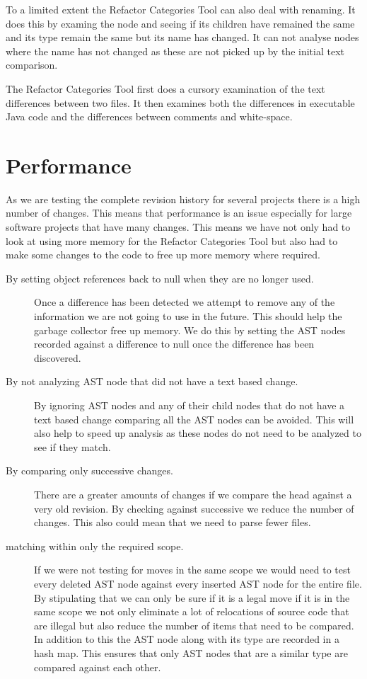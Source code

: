 To a limited extent the Refactor Categories Tool can also deal with renaming. It does this by examing the node and seeing if its children have remained the same and its type remain the same but its name has changed. It can not analyse nodes where the name has not changed as these are not picked up by the initial text comparison.

The Refactor Categories Tool first does a cursory examination of the text differences between two files. It then examines both the differences in executable Java code and the differences between comments and white-space. 



\section{Performance}
As we are testing the complete revision history for several projects there is a high number of changes.  This means that performance is an issue especially for large software projects that have many changes. This means we have not only had to look at using more memory for the Refactor Categories Tool but also had to make some changes to the code to free up more memory where required.

\begin{description}
 \item [By setting object references back to null when they are no longer used.]
  Once a difference has been detected we attempt to remove any of the information we are not going to use in the future.  This should help the garbage collector free up memory. We do this by setting the AST nodes recorded against a difference to null once the difference has been discovered. 
\item [By not analyzing AST node that did not have a text based change.] 
  By ignoring AST nodes and any of their child nodes that do not have a text based change comparing all the AST nodes can be avoided.  This will also help to speed up analysis as these nodes do not need to be analyzed to see if they match.
\item [By comparing only successive changes.] 
  There are a greater amounts of changes if we compare the head against a very old revision. By checking against successive we reduce the number of changes. This also could mean that we need to parse fewer files.
\item [matching within only the required scope.]
  If we were not testing for moves in the same scope we would need to test every deleted AST node against every inserted AST node for the entire file. By stipulating that we can only be sure if it is a legal move if it is in the same scope we not only eliminate a lot of relocations of source code that are illegal but also reduce the number of items that need to be compared. In addition to this the AST node along with its type are recorded in a hash map.  This ensures that only AST nodes that are a similar type are compared against each other.
\end{description}

